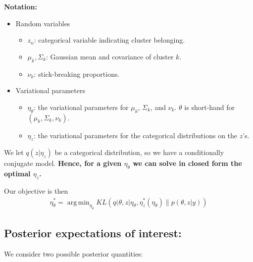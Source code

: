 \documentclass[a0,plainsections]{sciposter}\usepackage[]{graphicx}\usepackage[]{color}
\newcommand{\etazopt}{\eta_z^{*}}
\newcommand{\etathetaopt}{\eta_\theta^{*}}
\DeclareMathOperator*{\argmin}{arg\,min}
\begin{document}
\begin{minipage}[t]{0.45\textwidth}
\begin{figure}[!h]
% 
\setlength{\textfloatsep}{-10pt}
\end{figure}
\vspace{-0.3in}
{\bf Notation: }

\begin{itemize}
\item Random variables
\begin{itemize}
\item $z_n$: categorical variable indicating cluster belonging. 
\item $\mu_k, \Sigma_k$: Gaussian mean and covariance of cluster $k$. 
\item $\nu_k$: stick-breaking proportions. 
\end{itemize}
\item Variational parameters 
\begin{itemize}
\item $\eta_\theta$: the variational parameters for $\mu_k$, $\Sigma_k$, and $\nu_k$. $\theta$ is short-hand for $(\mu_k,\Sigma_k,\nu_k)$. 
\item $\eta_z$: the variational parameters for the categorical distributions on the 
$z$'s. 
\end{itemize}
\end{itemize}

We let $q(z | \eta_z)$ be a categorical distribution, so we have a conditionally conjugate model. {\bf Hence, for a given $\eta_\theta$ we can solve in closed form the optimal $\eta_z$.}

Our objective is then 
\vspace{-0.2in}
\begin{align}
\etathetaopt =
\argmin_{\eta_\theta} KL\left(
    q(\theta, z \vert \eta_\theta, \etazopt(\eta_\theta) \big\| p(\theta, z | y)
    \right)
    \label{eq:kl_objective}
\end{align}

\vspace{-0.7in}

\subsection*{Posterior expectations of interest: }
\vspace{-0.3in}
We consider two possible posterior quantities:


\end{minipage}
\end{document}
